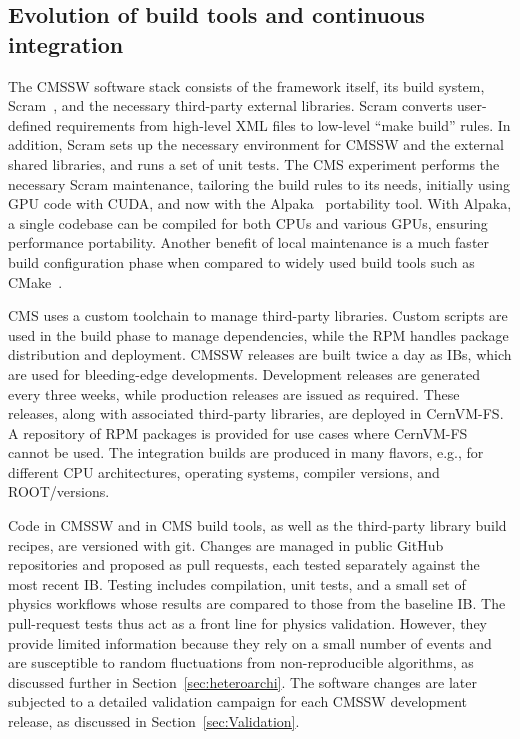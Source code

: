 \subsection{Evolution of build tools and continuous integration}
\label{sec:buildandintegration}

The \gls{CMSSW} software stack consists of the framework itself, its build system, Scram~\cite{scram:paper,scram:code}, and the necessary third-party external libraries. Scram converts user-defined requirements from high-level \gls{XML} files to low-level ``make build'' rules. In addition, Scram sets up the necessary environment for \gls{CMSSW} and the external shared libraries, and runs a set of unit tests. The CMS experiment performs the necessary Scram maintenance, tailoring the build rules to its needs, initially using \gls{GPU} code with \gls{CUDA}, and now with the Alpaka~\cite{worpitz:2015,zenker:2016,matthes:2017,bocci_2025_17986429} portability tool. With Alpaka, a single codebase can be compiled for both \glspl{CPU} and various \glspl{GPU}, ensuring performance portability.
Another benefit of local maintenance is a much faster build configuration phase when compared to widely used build tools such as CMake~\cite{cmake}.

CMS uses a custom toolchain to manage third-party libraries. Custom scripts are used in the build phase to manage dependencies, while the \gls{RPM} handles package distribution and deployment.
\gls{CMSSW} releases are built twice a day as \glspl{IB}, which are used for bleeding-edge developments. Development releases are generated every three weeks, while production releases are issued as required. These releases, along with associated third-party libraries, are deployed in \gls{CernVM-FS}. A repository of \gls{RPM} packages is provided for use cases where \gls{CernVM-FS} cannot be used. The integration builds are produced in many flavors, e.g., for different \gls{CPU} architectures, operating systems, compiler versions, and \textsc{ROOT}/\GEANTfour versions.

Code in \gls{CMSSW} and in CMS build tools, as well as the third-party library build recipes, are versioned with git. Changes are managed in public GitHub repositories and proposed as pull requests, each tested separately against the most recent \gls{IB}. Testing includes compilation, unit tests, and a small set of physics workflows whose results are compared to those from the baseline \gls{IB}. The pull-request tests thus act as a front line for physics validation. However, they provide limited information because they rely on a small number of events and are susceptible to random fluctuations from non-reproducible algorithms, as discussed further in Section~\ref{sec:heteroarchi}. The software changes are later subjected to a detailed validation campaign for each \gls{CMSSW} development release, as discussed in Section~\ref{sec:Validation}.


